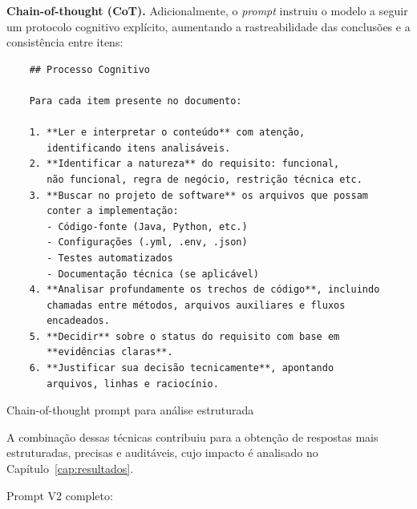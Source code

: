\textbf{Chain-of-thought (CoT).}
Adicionalmente, o \textit{prompt} instruiu o modelo a seguir um protocolo cognitivo explícito, aumentando a rastreabilidade das conclusões e a consistência entre itens:
\begin{algorithm}
\begin{verbatim}
    ## Processo Cognitivo
    
    Para cada item presente no documento:
    
    1. **Ler e interpretar o conteúdo** com atenção, 
       identificando itens analisáveis.
    2. **Identificar a natureza** do requisito: funcional, 
       não funcional, regra de negócio, restrição técnica etc.
    3. **Buscar no projeto de software** os arquivos que possam 
       conter a implementação:
       - Código-fonte (Java, Python, etc.)
       - Configurações (.yml, .env, .json)
       - Testes automatizados
       - Documentação técnica (se aplicável)
    4. **Analisar profundamente os trechos de código**, incluindo 
       chamadas entre métodos, arquivos auxiliares e fluxos 
       encadeados.
    5. **Decidir** sobre o status do requisito com base em 
       **evidências claras**.
    6. **Justificar sua decisão tecnicamente**, apontando 
       arquivos, linhas e raciocínio.
\end{verbatim}
\caption{Chain-of-thought prompt para análise estruturada}
\label{alg:prompt_cot}
\end{algorithm}

A combinação dessas técnicas contribuiu para a obtenção de respostas mais estruturadas, precisas e auditáveis, cujo impacto é analisado no Capítulo~\ref{cap:resultados}.

Prompt V2 completo:

